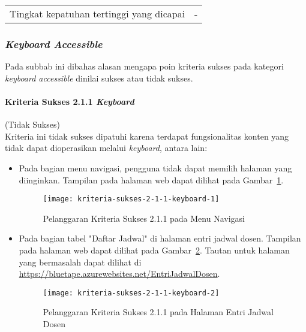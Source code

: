 \begin{center}
\begin{longtable}{|c|c|c|}
    \hline
    \multicolumn{2}{|c|}{Tingkat kepatuhan tertinggi yang dicapai} & - \\

\end{longtable}
\end{center}

\subsubsection{\textit{Keyboard Accessible}}
\label{subsubsec:kepatuhan_bluetape_keyboard_accessible}
Pada subbab ini dibahas alasan mengapa poin kriteria sukses pada kategori \textit{keyboard accessible} dinilai sukses atau tidak sukses.

\paragraph{Kriteria Sukses 2.1.1 \textit{Keyboard}}
\label{par:kepatuhan_bluetape_kriteria_sukses_2.1.1}
(Tidak Sukses)\\

Kriteria ini tidak sukses dipatuhi karena terdapat fungsionalitas konten yang tidak dapat dioperasikan melalui \textit{keyboard}, antara lain:

\begin{itemize}
    \item Pada bagian menu navigasi, pengguna tidak dapat memilih halaman yang diinginkan. Tampilan pada halaman web dapat dilihat pada \mbox{Gambar \ref{fig:2.1.1_keyboard_1}}.
    \begin{figure}[h]
        \centering  
        \texttt{[image: kriteria-sukses-2-1-1-keyboard-1]}  
        \caption[Pelanggaran Kriteria Sukses 2.1.1 pada Menu Navigasi]{Pelanggaran Kriteria Sukses 2.1.1 pada Menu Navigasi}
        \label{fig:2.1.1_keyboard_1}  
    \end{figure} 

    \item Pada bagian tabel "Daftar Jadwal" di halaman entri jadwal dosen. Tampilan pada halaman web dapat dilihat pada \mbox{Gambar \ref{fig:2.1.1_keyboard_2}}. Tautan untuk halaman yang bermasalah dapat dilihat di \url{https://bluetape.azurewebsites.net/EntriJadwalDosen}.
    \begin{figure}[H]
        \centering  
        \texttt{[image: kriteria-sukses-2-1-1-keyboard-2]}  
        \caption[Pelanggaran Kriteria Sukses 2.1.1 pada Halaman Entri Jadwal Dosen]{Pelanggaran Kriteria Sukses 2.1.1 pada Halaman Entri Jadwal Dosen}
        \label{fig:2.1.1_keyboard_2}  
    \end{figure} 
\end{itemize}

